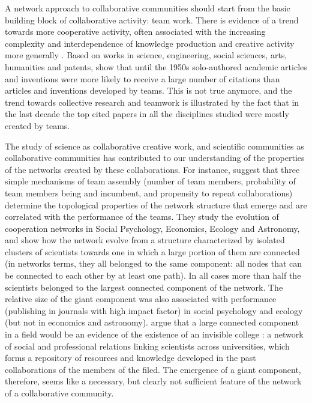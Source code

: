A network approach to collaborative communities should start from the basic building block of collaborative activity: team work. There is evidence of a trend towards more cooperative activity, often associated with the increasing complexity and interdependence of knowledge production and creative activity more generally \citep*{guimera:2005,uzzi:2005,uzzi:2007a,jones:2008}. Based on works in science, engineering, social sciences, arts, humanities and patents, \citet{uzzi:2007a} show that until the 1950s solo-authored academic articles and inventions were more likely to receive a large number of citations than articles and inventions developed by teams. This is not true anymore, and the trend towards collective research and teamwork is illustrated by the fact that in the last decade the top cited papers in all the disciplines studied were mostly created by teams.

The study of science as collaborative creative work, and scientific communities as collaborative communities has contributed to our understanding of the properties of the networks created by these collaborations. For instance, \citet{guimera:2005} suggest that three simple mechanisms of team assembly (number of team members, probability of team members being and incumbent, and propensity to repeat collaborations) determine the topological properties of the network structure that emerge and are correlated with the performance of the teams. They study the evolution of cooperation networks in Social Psychology, Economics, Ecology and Astronomy, and show how the network evolve from a structure characterized by isolated clusters of scientists towards one in which a large portion of them are connected (in networks terms, they all belonged to the same component: all nodes that can be connected to each other by at least one path). In all cases more than half the scientists belonged to the largest connected component of the network. The relative size of the giant component was also associated with performance (publishing in journals with high impact factor) in social psychology and ecology (but not in economics and astronomy). \citet{guimera:2005}  argue that a large connected component in a field would be an evidence of the existence of an invisible college \citep{solla:1986,merton:1979}: a network of social and professional relations linking scientists across universities, which forms a repository of resources and knowledge developed in the past collaborations of the members of the filed.  The emergence of a giant component, therefore, seems like a necessary, but clearly not sufficient feature of the network of a collaborative community.

